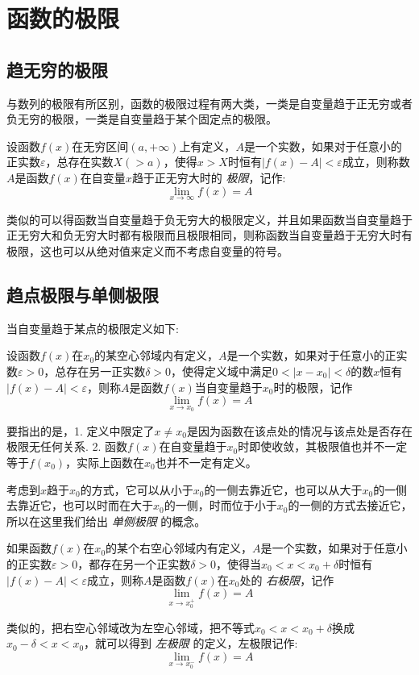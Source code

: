 
\section{函数的极限}
\label{sec:limit-of-function}

\subsection{趋无穷的极限}
\label{sec:limit-of-function-at-infinite-point}

与数列的极限有所区别，函数的极限过程有两大类，一类是自变量趋于正无穷或者负无穷的极限，一类是自变量趋于某个固定点的极限。

\begin{definition}
  设函数$f(x)$在无穷区间$(a,+\infty)$上有定义，$A$是一个实数，如果对于任意小的正实数$\varepsilon$，总存在实数$X(>a)$，使得$x>X$时恒有$|f(x)-A|<\varepsilon$成立，则称数$A$是函数$f(x)$在自变量$x$趋于正无穷大时的 \emph{极限}，记作:
  \[ \lim_{x\to\infty}f(x) = A \]
\end{definition}
类似的可以得函数当自变量趋于负无穷大的极限定义，并且如果函数当自变量趋于正无穷大和负无穷大时都有极限而且极限相同，则称函数当自变量趋于无穷大时有极限，这也可以从绝对值来定义而不考虑自变量的符号。


\subsection{趋点极限与单侧极限}
\label{sec:limit-of-function-at-point}

当自变量趋于某点的极限定义如下:
\begin{definition}
  设函数$f(x)$在$x_0$的某空心邻域内有定义，$A$是一个实数，如果对于任意小的正实数$\varepsilon>0$，总存在另一正实数$\delta>0$，使得定义域中满足$0<|x-x_0|<\delta$的数$x$恒有$|f(x)-A|<\varepsilon$，则称$A$是函数$f(x)$当自变量趋于$x_0$时的极限，记作
  \[ \lim_{x\to x_0} f(x) = A \]
\end{definition}
要指出的是，1. 定义中限定了$x\neq x_0$是因为函数在该点处的情况与该点处是否存在极限无任何关系. 2. 函数$f(x)$在自变量趋于$x_0$时即使收敛，其极限值也并不一定等于$f(x_0)$，实际上函数在$x_0$也并不一定有定义。

考虑到$x$趋于$x_0$的方式，它可以从小于$x_0$的一侧去靠近它，也可以从大于$x_0$的一侧去靠近它，也可以时而在大于$x_0$的一侧，时而位于小于$x_0$的一侧的方式去接近它，所以在这里我们给出 \emph{单侧极限} 的概念。

\begin{definition}
  如果函数$f(x)$在$x_0$的某个右空心邻域内有定义，$A$是一个实数，如果对于任意小的正实数$\varepsilon>0$，都存在另一个正实数$\delta>0$，使得当$x_0<x<x_0+\delta$时恒有$|f(x)-A|<\varepsilon$成立，则称$A$是函数$f(x)$在$x_0$处的 \emph{右极限}，记作
  \[ \lim_{x \to x_0^+} f(x) = A \]
\end{definition}
类似的，把右空心邻域改为左空心邻域，把不等式$x_0<x<x_0+\delta$换成$x_0-\delta<x<x_0$，就可以得到 \emph{左极限} 的定义，左极限记作:
  \[ \lim_{x \to x_0^-} f(x) = A \]

